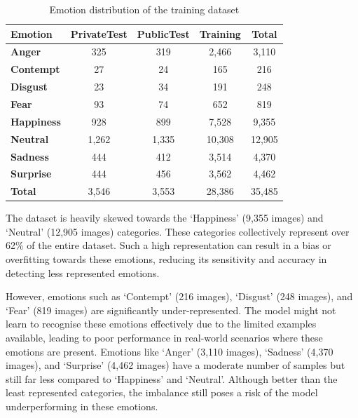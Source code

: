 \begin{table}[h!]
\centering{}
\caption{Emotion distribution of the training dataset}
\begin{tabular}{|l|c|c|c|c|}
\hline
\textbf{Emotion}   & \textbf{PrivateTest} & \textbf{PublicTest} & \textbf{Training} & \textbf{Total} \\ \hline
\textbf{Anger}     & 325                  & 319                 & 2,466             & 3,110          \\ \hline
\textbf{Contempt}  & 27                   & 24                  & 165               & 216            \\ \hline
\textbf{Disgust}   & 23                   & 34                  & 191               & 248            \\ \hline
\textbf{Fear}      & 93                   & 74                  & 652               & 819            \\ \hline
\textbf{Happiness} & 928                  & 899                 & 7,528             & 9,355          \\ \hline
\textbf{Neutral}   & 1,262                & 1,335               & 10,308            & 12,905         \\ \hline
\textbf{Sadness}   & 444                  & 412                 & 3,514             & 4,370          \\ \hline
\textbf{Surprise}  & 444                  & 456                 & 3,562             & 4,462          \\ \hline
\textbf{Total}     & 3,546                & 3,553               & 28,386            & 35,485         \\ \hline
\end{tabular}
\label{tab:emotion_distribution}
\end{table}

The dataset is heavily skewed towards the `Happiness' (9,355 images) and `Neutral' (12,905 images) categories. These categories collectively represent over 62\% of the entire dataset. Such a high representation can result in a bias or overfitting \cite{Rangulov2020-pd} towards these emotions, reducing its sensitivity and accuracy in detecting less represented emotions.

However, emotions such as `Contempt' (216 images), `Disgust' (248 images), and `Fear' (819 images) are significantly under-represented. The model might not learn to recognise these emotions effectively due to the limited examples available, leading to poor performance in real-world scenarios where these emotions are present. Emotions like `Anger' (3,110 images), `Sadness' (4,370 images), and `Surprise' (4,462 images) have a moderate number of samples but still far less compared to `Happiness' and `Neutral'. Although better than the least represented categories, the imbalance still poses a risk of the model underperforming in these emotions.

